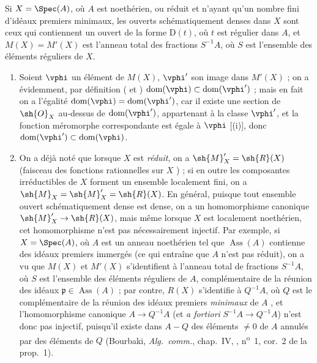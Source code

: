 \begin{corollary}[20.2.12]
\label{IV.20.2.12}
Si $X=\Spec(A)$, où $A$ est noethérien, ou réduit et n'ayant qu'un nombre fini d'idéaux premiers minimaux, les ouverts schématiquement denses dans $X$ sont ceux qui contiennent un ouvert de la forme $\mathrm{D}(t)$, où $t$ est régulier dans $A$, et $M(X)=M'(X)$ est l'anneau total des fractions $S^{-1}A$, où $S$ est l'ensemble des éléments réguliers de $X$.
\end{corollary}

\begin{remarks}[20.2.13]
\begin{enumerate}[label=(\roman*)]
  \item Soient $\vphi$ un élément de $M(X)$, $\vphi'$ son image dans $M'(X)$ ; on a évidemment, par définition ( et ) $\operatorname{dom}(\vphi)\subset\operatorname{dom}(\vphi')$ ; mais en fait on a l'égalité $\operatorname{dom}(\vphi)=\operatorname{dom}(\vphi')$, car il existe une section de $\sh{O}_X$ au-dessus de $\operatorname{dom}(\vphi')$, appartenant à la classe $\vphi'$, et la fonction méromorphe correspondante est égale à $\vphi$ [(i)], donc $\operatorname{dom}(\vphi')\subset\operatorname{dom}(\vphi)$.

  \item On a déjà noté que lorsque $X$ est \emph{réduit}, on a $\sh{M}'_X=\sh{R}(X)$ (faisceau des fonctions rationnelles sur $X$ ) ; si en outre les composantes irréductibles de $X$ forment un ensemble localement fini, on a $\sh{M}_X=\sh{M}'_X=\sh{R}(X)$.
  En général, puisque tout ensemble ouvert schématiquement dense est dense, on a un homomorphisme canonique $\sh{M}'_X\to\sh{R}(X)$, mais même lorsque $X$ est localement noethérien, cet homomorphisme n'est pas nécessairement injectif.
  Par exemple, si $X=\Spec(A)$, où $A$ est un anneau noethérien tel que $\operatorname{Ass}(A)$ contienne des idéaux premiers immergés (ce qui entraîne que $A$ n'est pas réduit), on a vu que $M(X)$ et $M'(X)$ s'identifient à l'anneau total de fractions $S^{-1}A$,
  où $S$ est l'ensemble des éléments réguliers de $A$, complémentaire de la réunion des idéaux $\mathfrak{p}\in\operatorname{Ass}(A)$ ; par contre, $R(X)$ s'identifie à $Q^{-1}A$, où $Q$ est le complémentaire de la réunion des idéaux premiers \emph{minimaux} de $A$ , et l'homomorphisme canonique $A\to Q^{-1}A$ (et \emph{a fortiori} $S^{-1}A\to Q^{-1}A$) n'est donc pas injectif, puisqu'il existe dans $A-Q$ des éléments $\neq0$ de $A$ annulés par des éléments de $Q$ (Bourbaki, \emph{Alg.~comm.}, chap.~IV, , n\textsuperscript{o}~1, cor.~2 de la prop.~1).


\end{enumerate}
\end{remarks}
